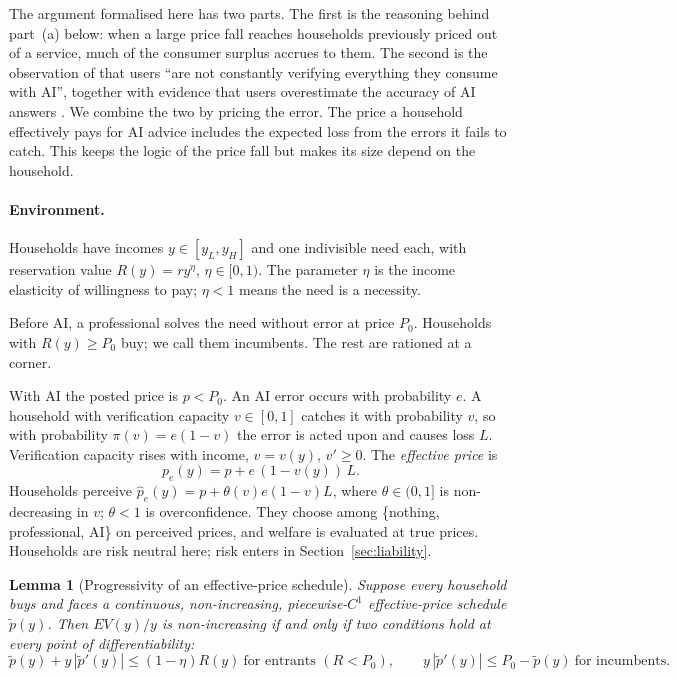 \documentclass[12pt]{article}
\newtheorem{lemma}{Lemma}
\theoremstyle{remark}
\begin{document}
The argument formalised here has two parts. The first is the reasoning behind part~(a) below: when a large price fall reaches households previously priced out of a service, much of the consumer surplus accrues to them. The second is the observation of \citet[p.~383]{stiglitz2026information} that users ``are not constantly verifying everything they consume with AI'', together with evidence that users overestimate the accuracy of AI answers \citep{steyvers2025know}. We combine the two by pricing the error. The price a household effectively pays for AI advice includes the expected loss from the errors it fails to catch. This keeps the logic of the price fall but makes its size depend on the household.

\paragraph{Environment.} Households have incomes $y\in[y_L,y_H]$ and one indivisible need each, with reservation value $R(y)=ry^\eta$, $\eta\in[0,1)$. The parameter $\eta$ is the income elasticity of willingness to pay; $\eta<1$ means the need is a necessity.

Before AI, a professional solves the need without error at price $P_0$. Households with $R(y)\ge P_0$ buy; we call them incumbents. The rest are rationed at a corner.

With AI the posted price is $p<P_0$. An AI error occurs with probability $e$. A household with verification capacity $v\in[0,1]$ catches it with probability $v$, so with probability $\pi(v)=e(1-v)$ the error is acted upon and causes loss $L$. Verification capacity rises with income, $v=v(y)$, $v'\ge0$. The \emph{effective price} is
\begin{equation}
p_e(y)=p+e\,(1-v(y))\,L .
\end{equation}
Households perceive $\hat p_e(y)=p+\theta(v)e(1-v)L$, where $\theta\in(0,1]$ is non-decreasing in $v$; $\theta<1$ is overconfidence. They choose among \{nothing, professional, AI\} on perceived prices, and welfare is evaluated at true prices. Households are risk neutral here; risk enters in Section~\ref{sec:liability}.

\begin{lemma}[Progressivity of an effective-price schedule]\label{lem:schedule}
Suppose every household buys and faces a continuous, non-increasing, piecewise-$C^1$ effective-price schedule $\tilde p(y)$. Then $EV(y)/y$ is non-increasing if and only if two conditions hold at every point of differentiability:
\[
\tilde p(y)+y\,|\tilde p'(y)|\le(1-\eta)R(y)\ \text{for entrants }(R<P_0),\qquad y\,|\tilde p'(y)|\le P_0-\tilde p(y)\ \text{for incumbents}.
\]
\end{lemma}
\end{document}
